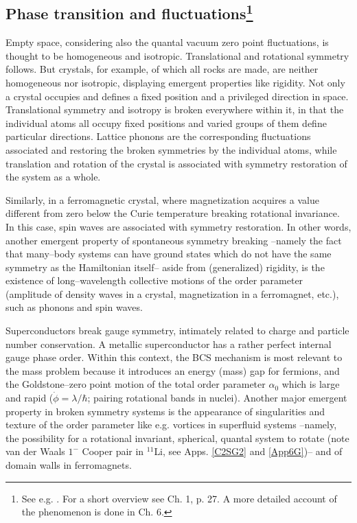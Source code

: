 \begin{subappendices}
  
 
 
 
 
 
 
 
 
\section[Phase transition and fluctuations]{Phase transition and fluctuations\footnote{See e.g. \cite{Anderson:84,Anderson:76,Anderson:64b}. For a short overview see \cite{Brink:05} Ch. 1, p. 27. A more detailed account of the phenomenon is done in Ch. 6.}}\label{C2AppE}
Empty space, considering also the quantal vacuum zero point fluctuations, is thought to be homogeneous and isotropic. Translational and rotational symmetry follows. But crystals, for example, of which all rocks are made, are neither homogeneous nor isotropic, displaying emergent properties like rigidity. Not only a crystal occupies and defines a fixed position and a privileged direction in space. Translational symmetry and isotropy is broken everywhere within it, in that the individual atoms all occupy fixed positions and varied groups of them define particular directions. Lattice phonons are the corresponding fluctuations associated and restoring the broken symmetries by the individual atoms, while translation and rotation of the crystal is associated with symmetry restoration of the system as a whole.


Similarly, in a ferromagnetic crystal, where magnetization acquires a value different from zero below the Curie temperature breaking rotational invariance. In this case, spin waves are associated with symmetry restoration. In other words, another emergent property of spontaneous symmetry breaking --namely the fact that many--body systems can have ground states which do not have the same symmetry as the Hamiltonian itself-- aside from (generalized) rigidity, is the existence of long--wavelength collective motions of the order parameter (amplitude of density waves in a crystal, magnetization in a ferromagnet, etc.), such as phonons and spin waves. 

  Superconductors break gauge symmetry, intimately related to charge and particle number conservation. A metallic superconductor has a rather perfect internal gauge phase order. Within this context, the BCS mechanism is most relevant to the mass problem because it introduces an energy (mass) gap for fermions, and the Goldstone--zero point motion of the total order parameter $\alpha_0$ which is large and rapid ($\dot\phi=\lambda/\hbar$; pairing rotational bands in  nuclei). Another major emergent property in broken symmetry systems is the appearance of singularities and texture of the order parameter like e.g. vortices in superfluid systems --namely, the possibility for a rotational invariant, spherical, quantal system to rotate (note van der Waals $1^-$ Cooper pair in $^{11}$Li, see Apps. \ref{C2SG2} and \ref{App6G})-- and of domain walls in ferromagnets.
  

\end{subappendices}
